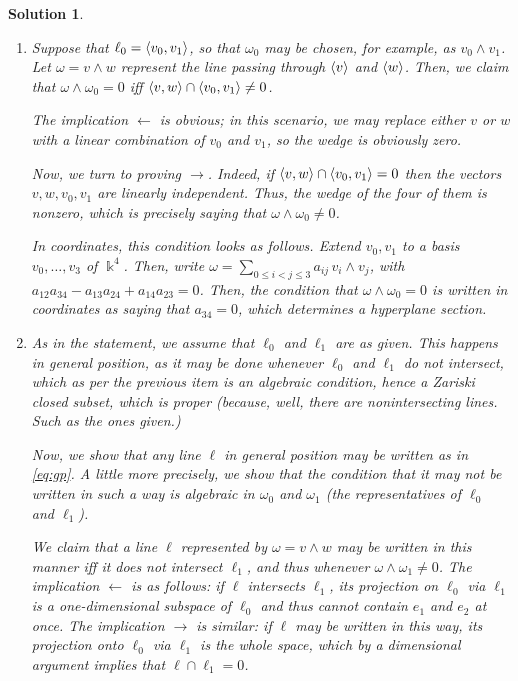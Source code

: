 \documentclass{article}
\theoremstyle{nonumberplain}
\newtheorem{sol}{Solution}
\newcommand{\kk}{\Bbbk}
\DeclarePairedDelimiter{\braket}{\langle}{\rangle}
\begin{document}
\begin{sol}
\leavevmode
\begin{enumerate}
\item Suppose that $\ell_0 = \braket{v_0,v_1}$, so that $\omega_0$ may be chosen, for example, as $v_0 \wedge v_1$. Let $\omega = v \wedge w$ represent the line passing through $\braket{v}$ and $\braket{w}$. Then, we claim that $\omega \wedge \omega_0 = 0$ iff $\braket{v,w} \cap \braket{v_0, v_1} \neq 0$.

The implication $\leftarrow$ is obvious; in this scenario, we may replace either $v$ or $w$ with a linear combination of $v_0$ and $v_1$, so the wedge is obviously zero.

Now, we turn to proving $\rightarrow$. Indeed, if $\braket{v,w} \cap \braket{v_0,v_1} = 0$ then the vectors $v,w,v_0,v_1$ are linearly independent. Thus, the wedge of the four of them is nonzero, which is precisely saying that $\omega \wedge \omega_0 \neq 0$.

\smallskip

In coordinates, this condition looks as follows. Extend $v_0,v_1$ to a basis $v_0, \dots, v_3$ of $\kk^4$. Then, write $\omega = \sum_{0 \leq i < j \leq 3} a_{ij} \, v_i \wedge v_j$, with $a_{12} a_{34} - a_{13} a_{24} + a_{14} a_{23} = 0$. Then, the condition that $\omega \wedge \omega_0 = 0$ is written in coordinates as saying that $a_{34} = 0$, which determines a hyperplane section.
	
\item As in the statement, we assume that $\ell_0$ and $\ell_1$ are as given. This happens in general position, as it may be done whenever $\ell_0$ and $\ell_1$ do not intersect, which as per the previous item is an algebraic condition, hence a Zariski closed subset, which is proper (because, well, there are nonintersecting lines. Such as the ones given.)

Now, we show that any line $\ell$ in general position may be written as in \eqref{eq:gp}. A little more precisely, we show that the condition that it may \emph{not} be written in such a way is algebraic in $\omega_0$ and $\omega_1$ (the representatives of $\ell_0$ and $\ell_1$).

We claim that a line $\ell$ represented by $\omega = v \wedge w$ may be written in this manner iff it does not intersect $\ell_1$, and thus whenever $\omega \wedge \omega_1 \neq 0$. The implication $\leftarrow$ is as follows: if $\ell$ intersects $\ell_1$, its projection on $\ell_0$ via $\ell_1$ is a one-dimensional subspace of $\ell_0$ and thus cannot contain $e_1$ and $e_2$ at once. The implication $\rightarrow$ is similar: if $\ell$ may be written in this way, its projection onto $\ell_0$ via $\ell_1$ is the whole space, which by a dimensional argument implies that $\ell \cap \ell_1 = 0$.


\end{enumerate}
\end{sol}
\end{document}
